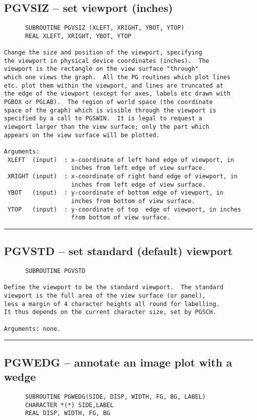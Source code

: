{\subsection*{PGVSIZ -- set viewport (inches) }
\begin{verbatim}
      SUBROUTINE PGVSIZ (XLEFT, XRIGHT, YBOT, YTOP)
      REAL XLEFT, XRIGHT, YBOT, YTOP

Change the size and position of the viewport, specifying
the viewport in physical device coordinates (inches).  The
viewport is the rectangle on the view surface "through"
which one views the graph.  All the PG routines which plot lines
etc. plot them within the viewport, and lines are truncated at
the edge of the viewport (except for axes, labels etc drawn with
PGBOX or PGLAB).  The region of world space (the coordinate
space of the graph) which is visible through the viewport is
specified by a call to PGSWIN.  It is legal to request a
viewport larger than the view surface; only the part which
appears on the view surface will be plotted.

Arguments:
 XLEFT  (input)  : x-coordinate of left hand edge of viewport, in
                   inches from left edge of view surface.
 XRIGHT (input)  : x-coordinate of right hand edge of viewport, in
                   inches from left edge of view surface.
 YBOT   (input)  : y-coordinate of bottom edge of viewport, in
                   inches from bottom of view surface.
 YTOP   (input)  : y-coordinate of top  edge of viewport, in inches
                   from bottom of view surface.
\end{verbatim}
\hrule


\subsection*{PGVSTD -- set standard (default) viewport }
\begin{verbatim}
      SUBROUTINE PGVSTD

Define the viewport to be the standard viewport.  The standard
viewport is the full area of the view surface (or panel),
less a margin of 4 character heights all round for labelling.
It thus depends on the current character size, set by PGSCH.

Arguments: none.
\end{verbatim}
\hrule


\subsection*{PGWEDG -- annotate an image plot with a wedge }
\begin{verbatim}
      SUBROUTINE PGWEDG(SIDE, DISP, WIDTH, FG, BG, LABEL)
      CHARACTER *(*) SIDE,LABEL
      REAL DISP, WIDTH, FG, BG


\end{verbatim}}
